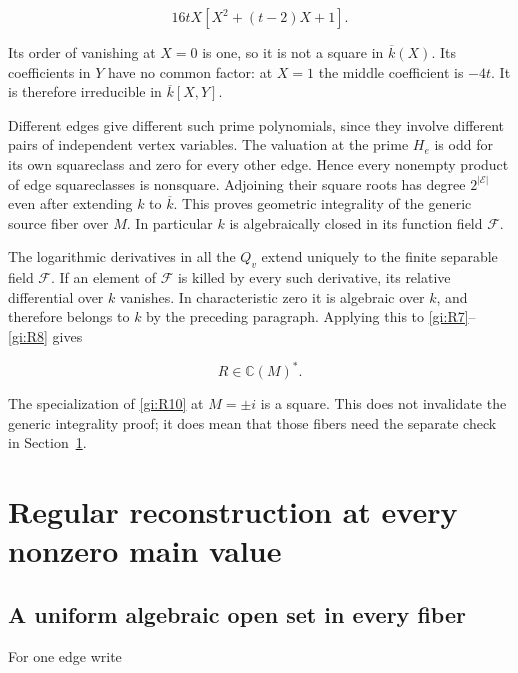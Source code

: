 \begin{equation}\label{gi:R11}
16tX[X^2+(t-2)X+1].
\end{equation}

Its order of vanishing at \(X=0\) is one, so it is not a square
in \(\overline{k}(X)\). Its coefficients in \(Y\) have no
common factor: at \(X=1\) the middle coefficient is \(-4t\).
It is therefore irreducible in \(\overline{k}[X,Y]\).

Different edges give different such prime polynomials, since they
involve different pairs of independent vertex variables. The valuation
at the prime \(H_e\) is odd for its own squareclass and zero for
every other edge. Hence every nonempty product of edge squareclasses
is nonsquare. Adjoining their square roots has degree \(2^{|\mathcal E|}\)
even after extending \(k\) to \(\overline{k}\). This proves
geometric integrality of the generic source fiber over \(M\).
In particular \(k\) is algebraically closed in its function
field \(\mathcal F\).

The logarithmic derivatives in all the \(Q_v\) extend uniquely
to the finite separable field \(\mathcal F\). If an element of
\(\mathcal F\) is killed by every such derivative, its relative
differential over \(k\) vanishes. In characteristic zero it is
algebraic over \(k\), and therefore belongs to \(k\) by the
preceding paragraph. Applying this to \eqref{gi:R7}--\eqref{gi:R8} gives

\begin{equation}\label{gi:R12}
R\in\mathbb C(M)^*.
\end{equation}

The specialization of \eqref{gi:R10} at \(M=\pm i\) is a square. This
does not invalidate the generic integrality proof; it does mean that
those fibers need the separate check in Section~\ref{gi:regular-reconstruction-at-every-nonzero-main-value}.

\section{Regular reconstruction at every nonzero main value}\label{gi:regular-reconstruction-at-every-nonzero-main-value}

\subsection{A uniform algebraic open set in every fiber}\label{gi:a-uniform-algebraic-open-set-in-every-fiber}

For one edge write

